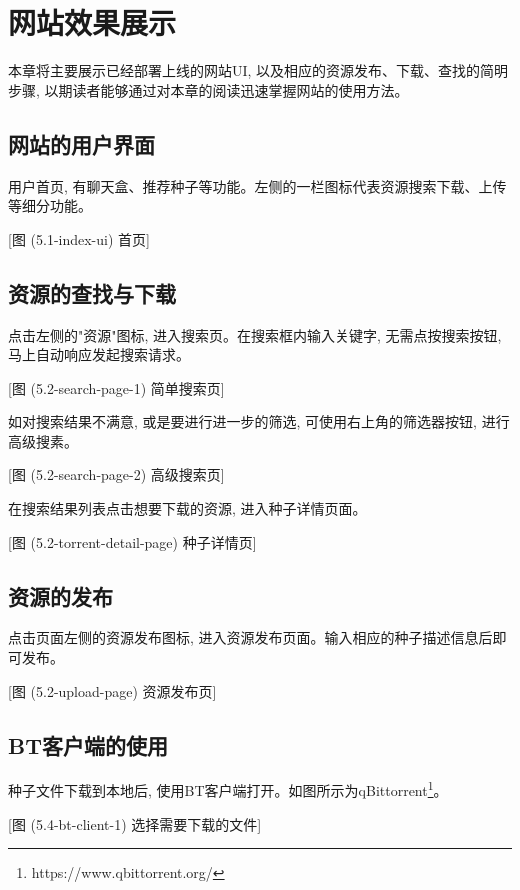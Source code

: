 \chapter{网站效果展示}

本章将主要展示已经部署上线的网站UI, 以及相应的资源发布、下载、查找的简明步骤, 以期读者能够通过对本章的阅读迅速掌握网站的使用方法。

\section{网站的用户界面}

用户首页, 有聊天盒、推荐种子等功能。左侧的一栏图标代表资源搜索下载、上传等细分功能。

[图 (5.1-index-ui) 首页]

\section{资源的查找与下载}

点击左侧的"资源"图标, 进入搜索页。在搜索框内输入关键字, 无需点按搜索按钮, 马上自动响应发起搜索请求。

[图 (5.2-search-page-1) 简单搜索页]

如对搜索结果不满意, 或是要进行进一步的筛选, 可使用右上角的筛选器按钮, 进行高级搜素。

[图 (5.2-search-page-2) 高级搜索页]

在搜索结果列表点击想要下载的资源, 进入种子详情页面。

[图 (5.2-torrent-detail-page) 种子详情页]

\section{资源的发布}

点击页面左侧的资源发布图标, 进入资源发布页面。输入相应的种子描述信息后即可发布。

[图 (5.2-upload-page) 资源发布页]

\section{BT客户端的使用}

种子文件下载到本地后, 使用BT客户端打开。如图所示为qBittorrent\footnote{https://www.qbittorrent.org/}。

[图 (5.4-bt-client-1) 选择需要下载的文件]


